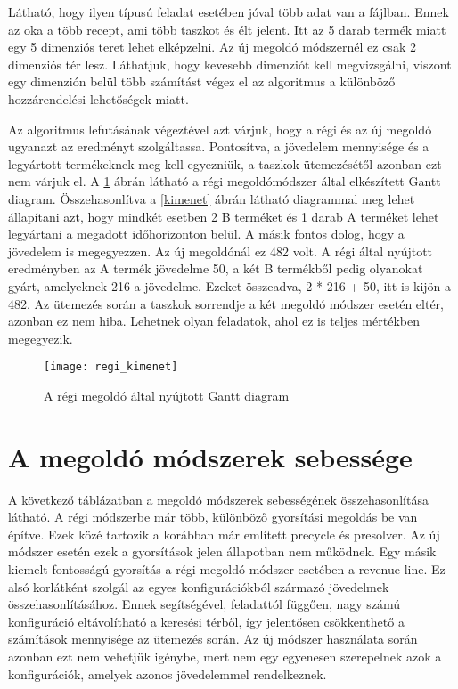 Látható, hogy ilyen típusú feladat esetében jóval több adat van a fájlban.
Ennek az oka a több recept, ami több taszkot és élt jelent.
Itt az 5 darab termék miatt egy 5 dimenziós teret lehet elképzelni.
Az új megoldó módszernél ez csak 2 dimenziós tér lesz.
Láthatjuk, hogy kevesebb dimenziót kell megvizsgálni, viszont egy dimenzión belül több számítást végez el az algoritmus a különböző hozzárendelési lehetőségek miatt. 

Az algoritmus lefutásának végeztével azt várjuk, hogy a régi és az új megoldó ugyanazt az eredményt szolgáltassa.
Pontosítva, a jövedelem mennyisége és a legyártott termékeknek meg kell egyezniük, a taszkok ütemezésétől azonban ezt nem várjuk el.
A \ref{regi_kimenet} ábrán látható a régi megoldómódszer által elkészített Gantt diagram.
Összehasonlítva a \ref{kimenet} ábrán látható diagrammal meg lehet állapítani azt, hogy mindkét esetben 2 B terméket és 1 darab A terméket lehet legyártani a megadott időhorizonton belül.
A másik fontos dolog, hogy a jövedelem is megegyezzen.
Az új megoldónál ez 482 volt.
A régi által nyújtott eredményben az A termék jövedelme 50, a két B termékből pedig olyanokat gyárt, amelyeknek 216 a jövedelme.
Ezeket összeadva, 2 * 216 + 50, itt is kijön a 482.
Az ütemezés során a taszkok sorrendje a két megoldó módszer esetén eltér, azonban ez nem hiba.
Lehetnek olyan feladatok, ahol ez is teljes mértékben megegyezik.

\begin{figure}[H]
\begin{center}
\texttt{[image: regi\_kimenet]}
\caption{A régi megoldó által nyújtott Gantt diagram}
\label{regi_kimenet}
\end{center}
\end{figure}

\section{A megoldó módszerek sebessége}
A következő táblázatban a megoldó módszerek sebességének összehasonlítása látható.
A régi módszerbe már több, különböző gyorsítási megoldás be van építve.
Ezek közé tartozik a korábban már említett precycle és presolver.
Az új módszer esetén ezek a gyorsítások jelen állapotban nem működnek.
Egy másik kiemelt fontosságú gyorsítás a régi megoldó módszer esetében a revenue line.
Ez alsó korlátként szolgál az egyes konfigurációkból származó jövedelmek összehasonlításához.
Ennek segítségével, feladattól függően, nagy számú konfiguráció eltávolítható a keresési térből, így jelentősen csökkenthető a számítások mennyisége az ütemezés során.
Az új módszer használata során azonban ezt nem vehetjük igénybe, mert nem egy egyenesen szerepelnek azok a konfigurációk, amelyek azonos jövedelemmel rendelkeznek. 

